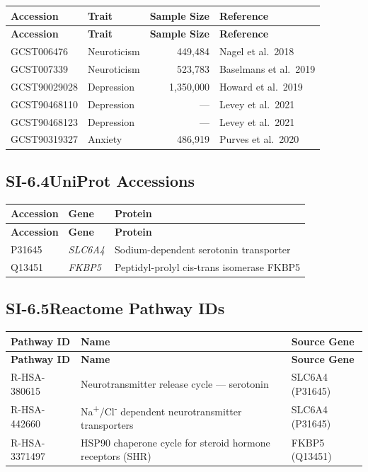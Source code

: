 \begin{longtable}{@{}l l r l@{}}
\toprule
\textbf{Accession} & \textbf{Trait} & \textbf{Sample Size} & \textbf{Reference} \\
\midrule
\endfirsthead
\toprule
\textbf{Accession} & \textbf{Trait} & \textbf{Sample Size} & \textbf{Reference} \\
\midrule
\endhead
\bottomrule
\endlastfoot
GCST006476  & Neuroticism & 449,484  & Nagel et al.\ 2018 \\
GCST007339  & Neuroticism & 523,783  & Baselmans et al.\ 2019 \\
GCST90029028 & Depression & 1,350,000 & Howard et al.\ 2019 \\
GCST90468110 & Depression & --- & Levey et al.\ 2021 \\
GCST90468123 & Depression & --- & Levey et al.\ 2021 \\
GCST90319327 & Anxiety    & 486,919  & Purves et al.\ 2020 \\
\end{longtable}

\subsection*{SI-6.4\quad UniProt Accessions}

\begin{longtable}{@{}l l l@{}}
\toprule
\textbf{Accession} & \textbf{Gene} & \textbf{Protein} \\
\midrule
\endfirsthead
\toprule
\textbf{Accession} & \textbf{Gene} & \textbf{Protein} \\
\midrule
\endhead
\bottomrule
\endlastfoot
P31645 & \textit{SLC6A4} & Sodium-dependent serotonin transporter \\
Q13451 & \textit{FKBP5}  & Peptidyl-prolyl cis-trans isomerase FKBP5 \\
\end{longtable}

\subsection*{SI-6.5\quad Reactome Pathway IDs}

\begin{longtable}{@{}l p{8cm} l@{}}
\toprule
\textbf{Pathway ID} & \textbf{Name} & \textbf{Source Gene} \\
\midrule
\endfirsthead
\toprule
\textbf{Pathway ID} & \textbf{Name} & \textbf{Source Gene} \\
\midrule
\endhead
\bottomrule
\endlastfoot
R-HSA-380615  & Neurotransmitter release cycle --- serotonin & SLC6A4 (P31645) \\
R-HSA-442660  & Na\textsuperscript{+}/Cl\textsuperscript{-} dependent neurotransmitter transporters & SLC6A4 (P31645) \\
R-HSA-3371497 & HSP90 chaperone cycle for steroid hormone receptors (SHR) & FKBP5 (Q13451) \\
\end{longtable}

